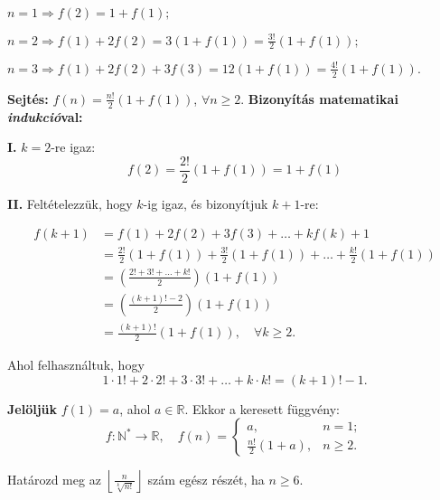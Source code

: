 \begin{solution}
$n=1\Longrightarrow f(2)=1+f(1);$

$n=2\Longrightarrow f(1)+2f(2)=3(1+f(1))=\frac{3!}{2}(1+f(1));$

$n=3\Longrightarrow f(1)+2f(2)+3f(3)=12(1+f(1))=\frac{4!}{2}(1+f(1)).$

\textbf{Sejtés:} $f(n)=\frac{n!}{2}(1+f(1))$, $\forall n\geq2$.
\textbf{Bizonyítás matematikai }\textbf{\textit{indukció}}\textbf{val:}

\textbf{I.} $k=2$-re igaz: 
\[
f(2)=\frac{2!}{2}(1+f(1))=1+f(1)
\]

\textbf{II.} Feltételezzük, hogy $k$-ig igaz, és bizonyítjuk $k+1$-re:

\begin{align*}
f(k+1) & =f(1)+2f(2)+3f(3)+\dots+kf(k)+1\\
 & =\frac{2!}{2}(1+f(1))+\frac{3!}{2}(1+f(1))+\dots+\frac{k!}{2}(1+f(1))\\
 & =\left(\frac{2!+3!+\dots+k!}{2}\right)(1+f(1))\\
 & =\left(\frac{(k+1)!-2}{2}\right)(1+f(1))\\
 & =\frac{(k+1)!}{2}(1+f(1)),\quad\forall k\geq2.
\end{align*}

Ahol felhasználtuk, hogy 
\[
1\cdot1!+2\cdot2!+3\cdot3!+\dots+k\cdot k!=(k+1)!-1.
\]

\textbf{Jelöljük} $f(1)=a$, ahol $a\in\mathbb{R}$. Ekkor a keresett
függvény: 
\[
f:\mathbb{N}^{*}\to\mathbb{R},\quad f(n)=\begin{cases}
a, & n=1;\\
\frac{n!}{2}(1+a), & n\geq2.
\end{cases}
\]
\end{solution}
\begin{extraproblem}
Határozd meg az $\left\lfloor \frac{n}{\sqrt[k]{n!}}\right\rfloor $
szám egész részét, ha $n\geq6$.
\end{extraproblem}

